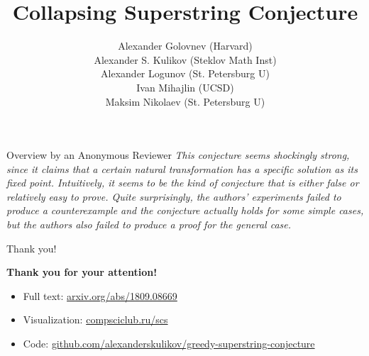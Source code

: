 \documentclass[14pt,xcolor=dvipsnames]{beamer}
\title{Collapsing Superstring Conjecture}
\date{}%
\author{Alexander Golovnev (Harvard)\\ Alexander S. Kulikov (Steklov Math Inst)\\ Alexander Logunov (St. Petersburg U)\\ Ivan Mihajlin (UCSD)\\ Maksim Nikolaev (St. Petersburg U)\\}
\begin{document}
\maketitle

\begin{frame}[label=in]{Overview by an Anonymous Reviewer}
\emph{This conjecture seems shockingly strong, since it claims that a certain natural transformation has a
specific solution as its fixed point. Intuitively, it seems to be the kind of conjecture that is either false or relatively easy to prove. Quite surprisingly, the authors' experiments \alert{failed} to produce a counterexample and the conjecture actually holds for some simple cases, but the authors \alert{also failed} to produce a proof for the general case.}
\end{frame}







\begin{frame}{Thank you!}
\vfill
\centerline{\alert{\bf \large Thank you for your attention!}}
\vfill
\begin{itemize}
\item \alert{Full text:} \url{arxiv.org/abs/1809.08669}
\item \alert{Visualization:} \url{compsciclub.ru/scs}
\item \alert{Code:} \url{github.com/alexanderskulikov/greedy-superstring-conjecture}
\end{itemize}
\vfill
\end{frame}
\end{document}
